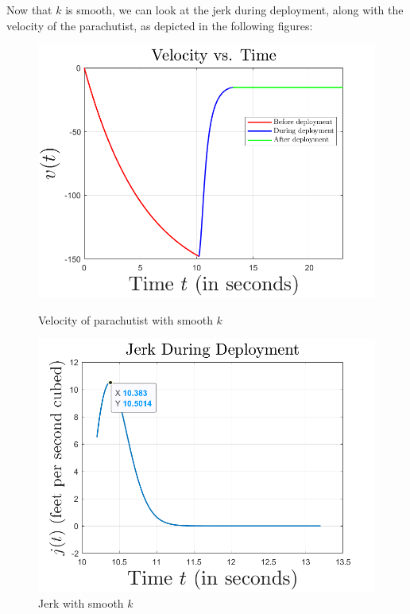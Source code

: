 \documentclass{article}
\begin{document}
    Now that $k$ is smooth, we can look at the jerk during deployment, along with the velocity of the parachutist, as depicted in the following figures:
    \begin{figure}[H]
        \centering
        \begin{minipage}{0.45\textwidth}
            \centering
            \includegraphics[scale = 0.4]{velocity plot cubic}
            \caption{Velocity of parachutist with smooth $k$}
        \end{minipage}
        \begin{minipage}{0.45\textwidth}
            \centering
            \includegraphics[scale = 0.4]{jerk plot}
            \caption{Jerk with smooth $k$}
        \end{minipage}
        
    \end{figure}
\end{document}
